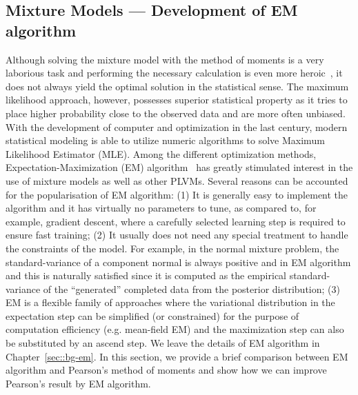 \subsection{Mixture Models --- Development of EM algorithm}

Although solving the mixture model with the method of moments is a very
laborious task and performing the necessary calculation is even more
heroic~\cite{mclachlan2004finite}, it does not always yield the optimal solution
in the statistical sense. The maximum likelihood approach, however, possesses
superior statistical property as it tries to place higher probability close to
the observed data and are more often unbiased. With the development of computer
and optimization in the last century, modern statistical modeling is able to
utilize numeric algorithms to solve Maximum Likelihood Estimator (MLE).  Among
the different optimization methods, Expectation-Maximization (EM)
algorithm~\cite{dempster1977maximum} has greatly stimulated interest in the use
of mixture models as well as other PLVMs. Several reasons can be accounted for
the popularisation of EM algorithm: (1) It is generally easy to implement the
algorithm and it has virtually no parameters to tune, as compared to, for
example, gradient descent, where a carefully selected learning step is required
to ensure fast training; (2) It usually does not need any special treatment to
handle the constraints of the model. For example, in the normal mixture problem,
the standard-variance of a component normal is always positive and in EM
algorithm and this is naturally satisfied since it is computed as the empirical
standard-variance of the ``generated'' completed data from the posterior
distribution; (3) EM is a flexible family of approaches where the variational
distribution in the expectation step can be simplified (or constrained) for the
purpose of computation efficiency (e.g. mean-field EM) and the maximization step
can also be substituted by an ascend step. We leave the details of EM algorithm
in Chapter~\ref{sec::bg-em}.  In this section, we provide a brief comparison
between EM algorithm and Pearson's method of moments and show how we can
improve Pearson's result by EM algorithm.

